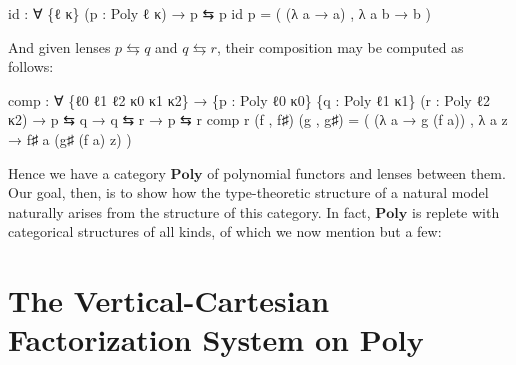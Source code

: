 \documentclass[
  11pt,
  oneside,
  article]{memoir}
\newenvironment{Shaded}{}{}
\newcommand{\NormalTok}[1]{#1}
\newcommand{\OtherTok}[1]{\textcolor[rgb]{0.00,0.44,0.13}{#1}}
\theoremstyle{definition}
\theoremstyle{plain}
\newcommand{\Cat}[1]{\mathbf{#1}}%
\newcommand{\poly}{\Cat{Poly}}
\newcommand{\0}{\textsf{0}}
\newcommand{\1}{\tn{\textsf{1}}}
\begin{document}
\begin{Shaded}
\begin{Highlighting}[]
\NormalTok{id }\OtherTok{:} \OtherTok{∀} \OtherTok{\{}\NormalTok{ℓ κ}\OtherTok{\}} \OtherTok{(}\NormalTok{p }\OtherTok{:}\NormalTok{ Poly ℓ κ}\OtherTok{)} \OtherTok{→}\NormalTok{ p ⇆ p}
\NormalTok{id p }\OtherTok{=} \OtherTok{(} \OtherTok{(λ}\NormalTok{ a }\OtherTok{→}\NormalTok{ a}\OtherTok{)}\NormalTok{ , }\OtherTok{λ}\NormalTok{ a b }\OtherTok{→}\NormalTok{ b }\OtherTok{)}
\end{Highlighting}
\end{Shaded}

And given lenses \(p \leftrightarrows q\) and \(q \leftrightarrows r\),
their composition may be computed as follows:

\begin{Shaded}
\begin{Highlighting}[]
\NormalTok{comp }\OtherTok{:} \OtherTok{∀} \OtherTok{\{}\NormalTok{ℓ0 ℓ1 ℓ2 κ0 κ1 κ2}\OtherTok{\}}
       \OtherTok{→} \OtherTok{\{}\NormalTok{p }\OtherTok{:}\NormalTok{ Poly ℓ0 κ0}\OtherTok{\}} \OtherTok{\{}\NormalTok{q }\OtherTok{:}\NormalTok{ Poly ℓ1 κ1}\OtherTok{\}} \OtherTok{(}\NormalTok{r }\OtherTok{:}\NormalTok{ Poly ℓ2 κ2}\OtherTok{)}
       \OtherTok{→}\NormalTok{ p ⇆ q }\OtherTok{→}\NormalTok{ q ⇆ r }\OtherTok{→}\NormalTok{ p ⇆ r}
\NormalTok{comp r }\OtherTok{(}\NormalTok{f , f♯}\OtherTok{)} \OtherTok{(}\NormalTok{g , g♯}\OtherTok{)} \OtherTok{=} 
     \OtherTok{(} \OtherTok{(λ}\NormalTok{ a }\OtherTok{→}\NormalTok{ g }\OtherTok{(}\NormalTok{f a}\OtherTok{))}\NormalTok{ , }\OtherTok{λ}\NormalTok{ a z }\OtherTok{→}\NormalTok{ f♯ a }\OtherTok{(}\NormalTok{g♯ }\OtherTok{(}\NormalTok{f a}\OtherTok{)}\NormalTok{ z}\OtherTok{)} \OtherTok{)}
\end{Highlighting}
\end{Shaded}

Hence we have a category \(\poly\) of polynomial functors and
lenses between them. Our goal, then, is to show how the type-theoretic
structure of a natural model naturally arises from the structure of this
category. In fact, \(\poly\) is replete with categorical
structures of all kinds, of which we now mention but a few:

\section{\texorpdfstring{The Vertical-Cartesian Factorization System on
\(\poly\)}{The Vertical-Cartesian Factorization System on \textbackslash mathbf\{Poly\}}}\label{the-vertical-cartesian-factorization-system-on-mathbfpoly}
\end{document}
